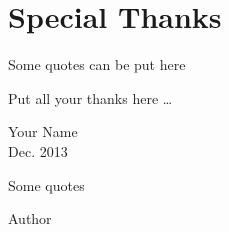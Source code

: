 \chapter*[Special Thanks]{Special Thanks} 
{\thanksfont
\begin{center}\epifont 

Some quotes can be put here

\end{center}\par \raggedyright[0.5em]

Put all your thanks here \ldots

}
\begin{flushright}\SingleSpacing     

Your Name\\ 
Dec. 2013 

\end{flushright} 
 

\par\vspace*{\fill}
\epigraph{\epifont\SingleSpacing

Some quotes}{Author}\newpage %
